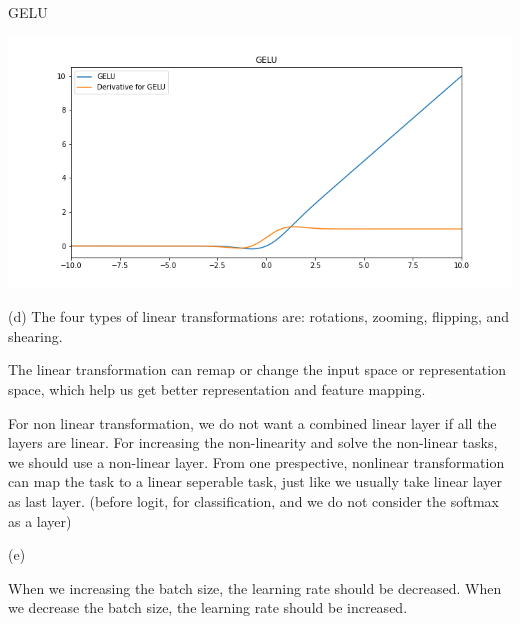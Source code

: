 


GELU

\includegraphics[width=\linewidth]{./imgs/GELU.png}




(d)
The four types of linear transformations are: rotations, zooming, flipping, and shearing.

The linear transformation can remap or change the input space or representation space, which help us get better representation and feature mapping.

For non linear transformation, we do not want a combined linear layer if all the layers are linear. For increasing the non-linearity and solve the non-linear tasks, we should use a non-linear layer. From one prespective, nonlinear transformation can map the task to a linear seperable task, just like we usually take linear layer as last layer. (before logit, for classification, and we do not consider the softmax as a layer)

(e)

When we increasing the batch size, the learning rate should be decreased.
When we decrease the batch size, the learning rate should be increased.


